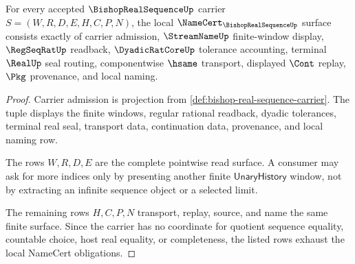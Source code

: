 \begin{theorem}
\label{thm:bishop-real-sequence-namecert-obligations}
For every accepted $\BishopRealSequenceUp$ carrier $S=(W,R,D,E,H,C,P,N)$, the local $\NameCert_{\BishopRealSequenceUp}$ surface consists exactly of carrier admission, $\StreamNameUp$ finite-window display, $\RegSeqRatUp$ readback, $\DyadicRatCoreUp$ tolerance accounting, terminal $\RealUp$ seal routing, componentwise $\hsame$ transport, displayed $\Cont$ replay, $\Pkg$ provenance, and local naming.
\end{theorem}
\begin{proof}
Carrier admission is projection from \autoref{def:bishop-real-sequence-carrier}. The tuple displays the finite windows, regular rational readback, dyadic tolerances, terminal real seal, transport data, continuation data, provenance, and local naming row.

The rows $W,R,D,E$ are the complete pointwise read surface. A consumer may ask for more indices only by presenting another finite $\mathsf{UnaryHistory}$ window, not by extracting an infinite sequence object or a selected limit.

The remaining rows $H,C,P,N$ transport, replay, source, and name the same finite surface. Since the carrier has no coordinate for quotient sequence equality, countable choice, host real equality, or completeness, the listed rows exhaust the local NameCert obligations.
\end{proof}




